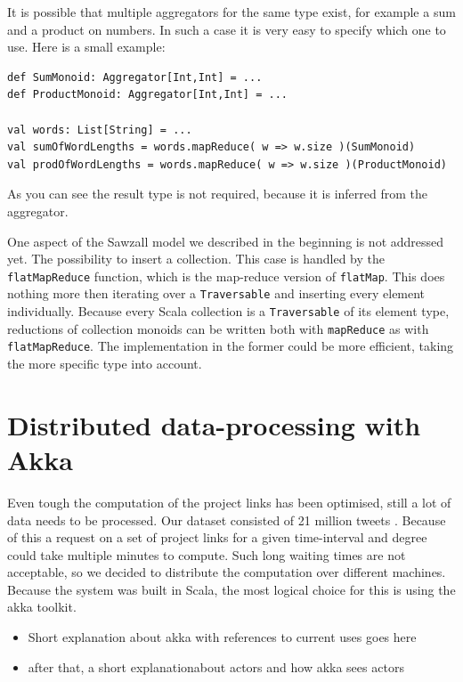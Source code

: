 \documentclass[10pt,a4paper]{article}
\begin{document}
It is possible that multiple aggregators for the same type exist, for example a sum and a product on numbers. In such a case it is very easy to specify which one to use. Here is a small example:
\begin{lstlisting}
def SumMonoid: Aggregator[Int,Int] = ...
def ProductMonoid: Aggregator[Int,Int] = ...

val words: List[String] = ...
val sumOfWordLengths = words.mapReduce( w => w.size )(SumMonoid)
val prodOfWordLengths = words.mapReduce( w => w.size )(ProductMonoid)
\end{lstlisting}
As you can see the result type is not required, because it is inferred from the aggregator.

One aspect of the Sawzall model we described in the beginning is not addressed yet. The possibility to insert a collection. This case is handled by the \lstinline|flatMapReduce| function, which is the map-reduce version of \lstinline|flatMap|. This does nothing more then iterating over a \lstinline|Traversable| and inserting every element individually. Because every Scala collection is a \lstinline|Traversable| of its element type, reductions of collection monoids can be written both with \lstinline|mapReduce| as with \lstinline|flatMapReduce|. The implementation in the former could be more efficient, taking the more specific type into account.

\section{Distributed data-processing with Akka}\label{sec:distributed}

Even tough the computation of the project links has been optimised, still a lot of data needs to be processed. Our dataset consisted of 21 million tweets . Because of this a request on a set of project links for a given time-interval and degree could take multiple minutes to compute. Such long waiting times are not acceptable, so we decided to distribute the computation over different machines. Because the system was built in Scala, the most logical choice for this is using the akka toolkit.

\begin{itemize}
	\item Short explanation about akka with references to current uses goes here
	\item after that, a short explanationabout actors and how akka sees actors
\end{itemize}
\end{document}
